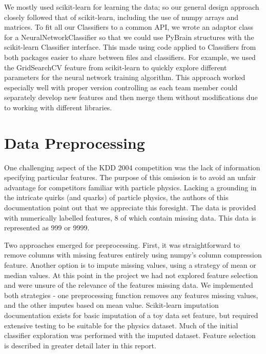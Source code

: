 \documentclass{article}
\begin{document}
We mostly used scikit-learn for learning the data; so our general design approach closely followed that of scikit-learn, including the use of numpy arrays and matrices.
To fit all our Classifiers to a common API, we wrote an adaptor class for a NeuralNetworkClassifier so that we could use PyBrain structures with the scikit-learn Classifier interface.
This made using code applied to Classifiers from both packages easier to share between files and classifiers.
For example, we used the GridSearchCV feature from scikit-learn to quickly explore different parameters for the neural network training algorithm.
This approach worked especially well with proper version controlling as each team member could separately develop new features and then merge them without modifications due to working with different libraries.


\section{Data Preprocessing}

One challenging aspect of the KDD 2004 competition was the lack of information specifying particular features.
The purpose of this omission is to avoid an unfair advantage for competitors familiar with particle physics.
Lacking a grounding in the intricate quirks (and quarks) of particle physics, the authors of this documentation point out that we appreciate this foresight.
The data is provided with numerically labelled features, 8 of which contain missing data.
This data is represented as 999 or 9999.

Two approaches emerged for preprocessing.
First, it was straightforward to remove columns with missing features entirely using numpy's column compression feature.
Another option is to impute missing values, using a strategy of mean or median values.
At this point in the project we had not explored feature selection and were unsure of the relevance of the features missing data.
We implemented both strategies - one preprocessing function removes any features missing values, and the other imputes based on mean value.
Scikit-learn imputation documentation exists for basic imputation of a toy data set feature, but required extensive testing to be suitable for the physics dataset.
Much of the initial classifier exploration was performed with the imputed dataset.
Feature selection is described in greater detail later in this report.
\end{document}
